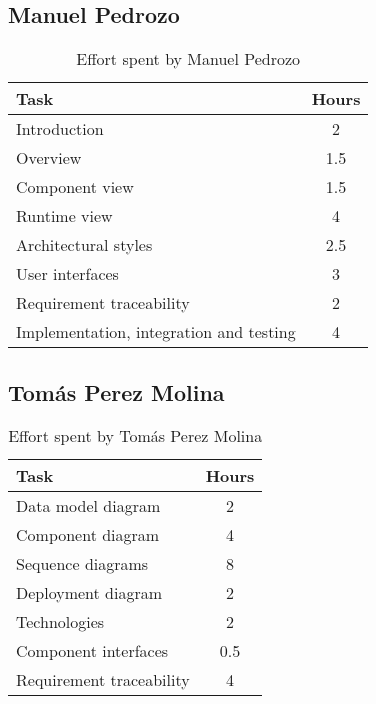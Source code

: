 \subsection{Manuel Pedrozo}

\begin{table}[H]
    \centering
    \begin{tabular}{|p{7cm}|c|}
    \hline
    \textbf{Task} & \textbf{Hours} \\ \hline
    Introduction & 2 \\ \hline
    Overview & 1.5 \\ \hline
    Component view & 1.5 \\ \hline
    Runtime view & 4 \\ \hline
    Architectural styles & 2.5 \\ \hline
    User interfaces & 3 \\ \hline
    Requirement traceability & 2 \\ \hline
    Implementation, integration and testing & 4 \\ \hline
    \end{tabular}
    \caption{\label{tbl:manuel-effort} Effort spent by Manuel Pedrozo}
    \end{table}

\subsection{Tomás Perez Molina}
\begin{table}[H]
    \centering
    \begin{tabular}{|p{7cm}|c|}
    \hline
    \textbf{Task} & \textbf{Hours} \\ \hline
    Data model diagram & 2 \\ \hline
    Component diagram & 4 \\ \hline
    Sequence diagrams & 8 \\ \hline
    Deployment diagram & 2 \\ \hline
    Technologies & 2 \\ \hline
    Component interfaces & 0.5 \\ \hline
    Requirement traceability & 4 \\ \hline
    \end{tabular}
    \caption{\label{tbl:tomas-effort} Effort spent by Tomás Perez Molina}
    \end{table}
